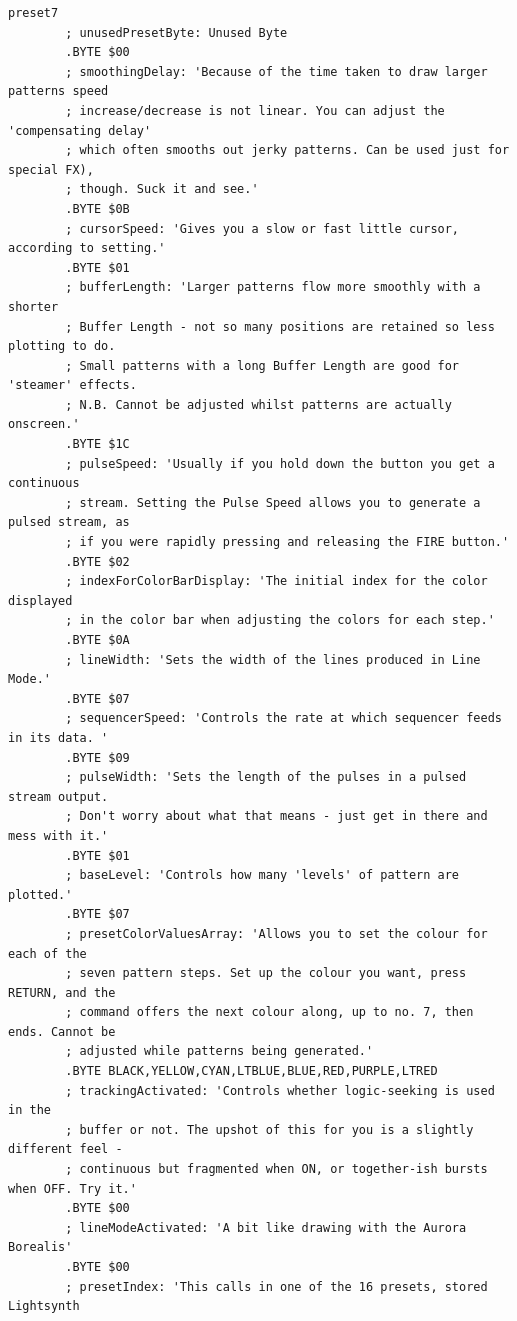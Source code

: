 \begin{lstlisting}[basicstyle=\ttfamily\tiny,caption=Source code for Preset 7.]
preset7
        ; unusedPresetByte: Unused Byte
        .BYTE $00
        ; smoothingDelay: 'Because of the time taken to draw larger patterns speed
        ; increase/decrease is not linear. You can adjust the 'compensating delay'
        ; which often smooths out jerky patterns. Can be used just for special FX),
        ; though. Suck it and see.'
        .BYTE $0B
        ; cursorSpeed: 'Gives you a slow or fast little cursor, according to setting.'
        .BYTE $01
        ; bufferLength: 'Larger patterns flow more smoothly with a shorter
        ; Buffer Length - not so many positions are retained so less plotting to do.
        ; Small patterns with a long Buffer Length are good for 'steamer' effects.
        ; N.B. Cannot be adjusted whilst patterns are actually onscreen.'
        .BYTE $1C
        ; pulseSpeed: 'Usually if you hold down the button you get a continuous
        ; stream. Setting the Pulse Speed allows you to generate a pulsed stream, as
        ; if you were rapidly pressing and releasing the FIRE button.'
        .BYTE $02
        ; indexForColorBarDisplay: 'The initial index for the color displayed
        ; in the color bar when adjusting the colors for each step.'
        .BYTE $0A
        ; lineWidth: 'Sets the width of the lines produced in Line Mode.'
        .BYTE $07
        ; sequencerSpeed: 'Controls the rate at which sequencer feeds in its data. '
        .BYTE $09
        ; pulseWidth: 'Sets the length of the pulses in a pulsed stream output.
        ; Don't worry about what that means - just get in there and mess with it.'
        .BYTE $01
        ; baseLevel: 'Controls how many 'levels' of pattern are plotted.'
        .BYTE $07
        ; presetColorValuesArray: 'Allows you to set the colour for each of the
        ; seven pattern steps. Set up the colour you want, press RETURN, and the
        ; command offers the next colour along, up to no. 7, then ends. Cannot be
        ; adjusted while patterns being generated.'
        .BYTE BLACK,YELLOW,CYAN,LTBLUE,BLUE,RED,PURPLE,LTRED
        ; trackingActivated: 'Controls whether logic-seeking is used in the
        ; buffer or not. The upshot of this for you is a slightly different feel -
        ; continuous but fragmented when ON, or together-ish bursts when OFF. Try it.'
        .BYTE $00
        ; lineModeActivated: 'A bit like drawing with the Aurora Borealis'
        .BYTE $00
        ; presetIndex: 'This calls in one of the 16 presets, stored Lightsynth

\end{lstlisting}
